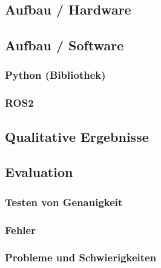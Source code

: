 	\subsection{Aufbau / Hardware}
		\label{chap:aufbau_hardware}
	
	\subsection{Aufbau / Software}
		\subsubsection{Python (Bibliothek)}
		\subsubsection{ROS2}
		
	\subsection{Qualitative Ergebnisse}
	
	\subsection{Evaluation}
		\subsubsection{Testen von Genauigkeit}
		\subsubsection{Fehler}
		\subsubsection{Probleme und Schwierigkeiten}
			\label{chap:probleme_schwierigkeiten}